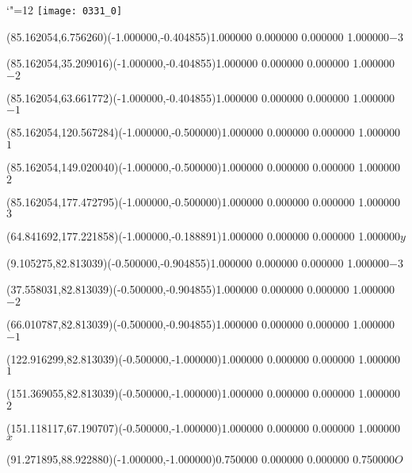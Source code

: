 \documentclass[12pt]{article}
\begin{document}
\makeatletter%
\let\ASYencoding\f@encoding%
\let\ASYfamily\f@family%
\let\ASYseries\f@series%
\let\ASYshape\f@shape%
\makeatother%
{\catcode`"=12%
\texttt{[image: 0331\_0]}%
}%
\kern -156.208695pt%
%
%
\fontsize{12.000000}{14.400000}\selectfont%
\usefont{\ASYencoding}{\ASYfamily}{\ASYseries}{\ASYshape}%
\ASYalignT(85.162054,6.756260)(-1.000000,-0.404855){1.000000 0.000000 0.000000 1.000000}{\vphantom{$10^4$}$-3$}%
%
%
\fontsize{12.000000}{14.400000}\selectfont%
\ASYalignT(85.162054,35.209016)(-1.000000,-0.404855){1.000000 0.000000 0.000000 1.000000}{\vphantom{$10^4$}$-2$}%
%
%
\fontsize{12.000000}{14.400000}\selectfont%
\ASYalignT(85.162054,63.661772)(-1.000000,-0.404855){1.000000 0.000000 0.000000 1.000000}{\vphantom{$10^4$}$-1$}%
%
%
\fontsize{12.000000}{14.400000}\selectfont%
\ASYalignT(85.162054,120.567284)(-1.000000,-0.500000){1.000000 0.000000 0.000000 1.000000}{\vphantom{$10^4$}$1$}%
%
%
\fontsize{12.000000}{14.400000}\selectfont%
\ASYalignT(85.162054,149.020040)(-1.000000,-0.500000){1.000000 0.000000 0.000000 1.000000}{\vphantom{$10^4$}$2$}%
%
%
\fontsize{12.000000}{14.400000}\selectfont%
\ASYalignT(85.162054,177.472795)(-1.000000,-0.500000){1.000000 0.000000 0.000000 1.000000}{\vphantom{$10^4$}$3$}%
%
%
\fontsize{12.000000}{14.400000}\selectfont%
\ASYalignT(64.841692,177.221858)(-1.000000,-0.188891){1.000000 0.000000 0.000000 1.000000}{$y$}%
%
%
\fontsize{12.000000}{14.400000}\selectfont%
\ASYalignT(9.105275,82.813039)(-0.500000,-0.904855){1.000000 0.000000 0.000000 1.000000}{\vphantom{$10^4$}$-3$}%
%
%
\fontsize{12.000000}{14.400000}\selectfont%
\ASYalignT(37.558031,82.813039)(-0.500000,-0.904855){1.000000 0.000000 0.000000 1.000000}{\vphantom{$10^4$}$-2$}%
%
%
\fontsize{12.000000}{14.400000}\selectfont%
\ASYalignT(66.010787,82.813039)(-0.500000,-0.904855){1.000000 0.000000 0.000000 1.000000}{\vphantom{$10^4$}$-1$}%
%
%
\fontsize{12.000000}{14.400000}\selectfont%
\ASYalignT(122.916299,82.813039)(-0.500000,-1.000000){1.000000 0.000000 0.000000 1.000000}{\vphantom{$10^4$}$1$}%
%
%
\fontsize{12.000000}{14.400000}\selectfont%
\ASYalignT(151.369055,82.813039)(-0.500000,-1.000000){1.000000 0.000000 0.000000 1.000000}{\vphantom{$10^4$}$2$}%
%
%
\fontsize{12.000000}{14.400000}\selectfont%
\ASYalignT(151.118117,67.190707)(-0.500000,-1.000000){1.000000 0.000000 0.000000 1.000000}{$x$}%
%
%
\fontsize{12.000000}{14.400000}\selectfont%
\ASYalignT(91.271895,88.922880)(-1.000000,-1.000000){0.750000 0.000000 0.000000 0.750000}{\vphantom{$10^4$}$O$}%
\end{document}
